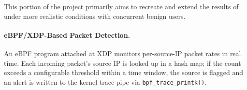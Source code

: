 \documentclass[twocolumn, 10pt]{scrartcl}
\begin{document}


This portion of the project primarily aims to recreate and extend the results of~\cite{tolay2025ebpf} under more realistic conditions with concurrent benign users.

\paragraph{eBPF/XDP-Based Packet Detection.}
An eBPF program attached at XDP monitors per-source-IP packet rates in real time. Each incoming packet's source IP is looked up in a hash map; if the count exceeds a configurable threshold within a time window, the source is flagged and an alert is written to the kernel trace pipe via \texttt{bpf\_trace\_printk()}.
\end{document}
